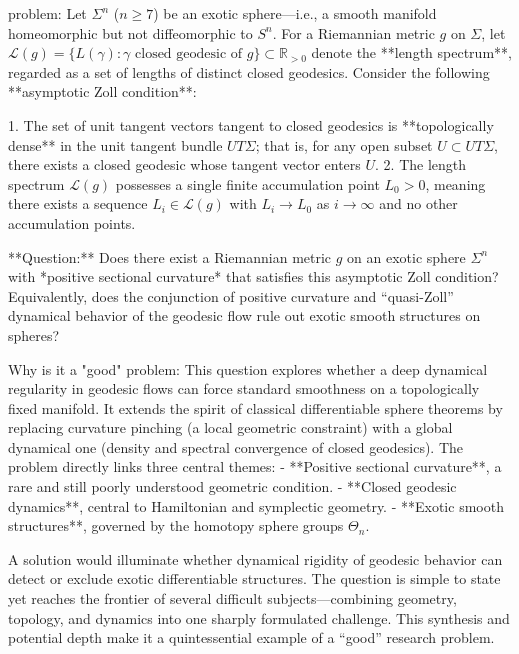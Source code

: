 problem:  
Let \( \Sigma^n \) (\( n \ge 7 \)) be an exotic sphere—i.e., a smooth manifold homeomorphic but not diffeomorphic to \( S^n \).  
For a Riemannian metric \( g \) on \( \Sigma \), let \( \mathcal{L}(g) = \{ L(\gamma) : \gamma \text{ closed geodesic of } g \} \subset \mathbb{R}_{>0} \) denote the **length spectrum**, regarded as a set of lengths of distinct closed geodesics.  
Consider the following **asymptotic Zoll condition**:

1. The set of unit tangent vectors tangent to closed geodesics is **topologically dense** in the unit tangent bundle \( U T\Sigma \); that is, for any open subset \( U \subset U T\Sigma \), there exists a closed geodesic whose tangent vector enters \( U \).  
2. The length spectrum \( \mathcal{L}(g) \) possesses a single finite accumulation point \( L_0 > 0 \), meaning there exists a sequence \( L_i \in \mathcal{L}(g) \) with \( L_i \to L_0 \) as \( i \to \infty \) and no other accumulation points.

**Question:**  
Does there exist a Riemannian metric \( g \) on an exotic sphere \( \Sigma^n \) with *positive sectional curvature* that satisfies this asymptotic Zoll condition?  
Equivalently, does the conjunction of positive curvature and “quasi-Zoll” dynamical behavior of the geodesic flow rule out exotic smooth structures on spheres?

Why is it a "good" problem:  
This question explores whether a deep dynamical regularity in geodesic flows can force standard smoothness on a topologically fixed manifold. It extends the spirit of classical differentiable sphere theorems by replacing curvature pinching (a local geometric constraint) with a global dynamical one (density and spectral convergence of closed geodesics).  
The problem directly links three central themes:
- **Positive sectional curvature**, a rare and still poorly understood geometric condition.  
- **Closed geodesic dynamics**, central to Hamiltonian and symplectic geometry.  
- **Exotic smooth structures**, governed by the homotopy sphere groups \( \Theta_n \).  

A solution would illuminate whether dynamical rigidity of geodesic behavior can detect or exclude exotic differentiable structures. The question is simple to state yet reaches the frontier of several difficult subjects—combining geometry, topology, and dynamics into one sharply formulated challenge. This synthesis and potential depth make it a quintessential example of a “good” research problem.